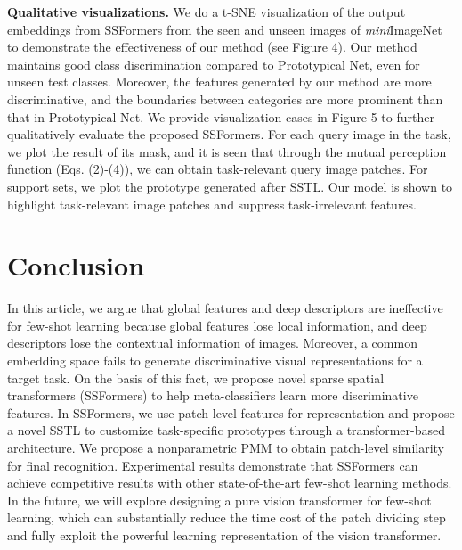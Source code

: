 \documentclass{SCIS2019}
\begin{document}
\textbf{Qualitative visualizations.} 
We do a t-SNE visualization of the output embeddings from SSFormers from the seen and unseen images of \emph{mini}ImageNet to demonstrate the effectiveness of our method (see Figure 4). Our method maintains good class discrimination compared to Prototypical Net, even for unseen test classes. Moreover, the features generated by our method are more discriminative, and the boundaries between categories are more prominent than that in Prototypical Net. We provide visualization cases in Figure 5 to further qualitatively evaluate the proposed SSFormers. For each query image in the task, we plot the result of its mask, and it is seen that through the mutual perception function (Eqs. (2)-(4)), we can obtain task-relevant query image patches. For support sets, we plot the prototype generated after SSTL. Our model is shown to highlight task-relevant image patches and suppress task-irrelevant features.
 
\section{Conclusion}
In this article, we argue that global features and deep descriptors are ineffective for few-shot learning because global features lose local information, and deep descriptors lose the contextual information of images.
Moreover, a common embedding space fails to generate discriminative visual representations for a target task. On the basis of this fact, we propose novel sparse spatial transformers (SSFormers) to help meta-classifiers learn more discriminative features. In SSFormers, we use patch-level features for representation and propose a novel SSTL to customize task-specific prototypes through a transformer-based architecture. We propose a nonparametric PMM to obtain patch-level similarity for final recognition. Experimental results demonstrate that SSFormers can achieve competitive results with other state-of-the-art few-shot learning methods. In the future, we will explore designing a pure vision transformer for few-shot learning, which can substantially reduce the time cost of the patch dividing step and fully exploit the powerful learning representation of the vision transformer.

\end{document}
